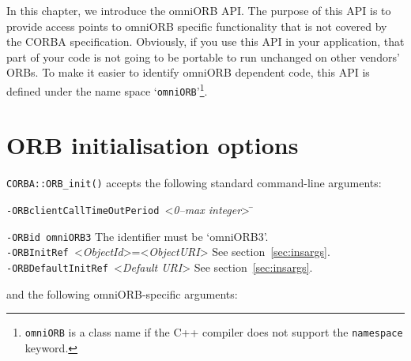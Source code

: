 \documentclass[11pt,twoside,a4paper]{book}
\newcommand{\code}[1]{\texttt{#1}}
\newcommand{\op}[1]{\texttt{#1()}}
\newcommand{\cmdline}[1]{\texttt{#1}}
\begin{document}
In this chapter, we introduce the omniORB API. The purpose of this API
is to provide access points to omniORB specific functionality that is
not covered by the CORBA specification.  Obviously, if you use this
API in your application, that part of your code is not going to be
portable to run unchanged on other vendors' ORBs. To make it easier to
identify omniORB dependent code, this API is defined under the name
space `\code{omniORB}'\footnote{\code{omniORB} is a class name if the
C++ compiler does not support the \code{namespace} keyword.}.

\section{ORB initialisation options}
\label{omniorbapioptions}

\op{CORBA::ORB\_init} accepts the following standard command-line
arguments:

\begin{tabbing}
\cmdline{-ORBclientCallTimeOutPeriod }<\textit{0--max integer}> \=\kill

\cmdline{-ORBid omniORB3} \> The identifier must be `omniORB3'.\\

\cmdline{-ORBInitRef }<\textit{ObjectId}>=<\textit{ObjectURI}>
                          \> See section~\ref{sec:insargs}.\\

\cmdline{-ORBDefaultInitRef }<\textit{Default URI}>
                          \> See section~\ref{sec:insargs}.
\end{tabbing}


\noindent and the following omniORB-specific arguments:
\end{document}
